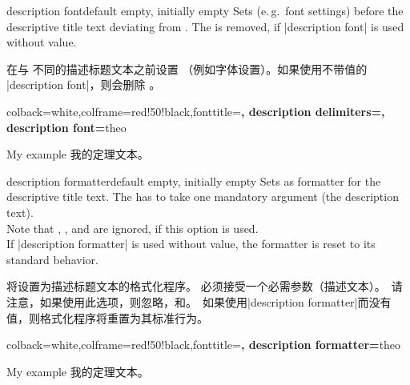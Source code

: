 \begin{docTcbKey}{description font}{}{default empty, initially empty}
Sets  (e.\,g.\ font settings) before the descriptive title text deviating from .
The  is removed, if |description font| is used without value.

在与  不同的描述标题文本之前设置 （例如字体设置）。如果使用不带值的 |description font|，则会删除 。
\begin{dispExample}
%
  {colback=white,colframe=red!50!black,fonttitle=\bfseries,
   description delimiters={\glqq}{\grqq},
   description font=\mdseries\itshape}{theo}
\begin{sometheorem}{My example}{}
我的定理文本。
\end{sometheorem}
\end{dispExample}
\end{docTcbKey}


\begin{docTcbKey}{description formatter}{}{default empty, initially empty}
Sets  as formatter for the descriptive title text. The 
has to take one mandatory argument (the description text).\\ 
Note that , ,
and  are ignored, if this option is used.\\
If |description formatter| is used without value, the formatter is reset
to its standard behavior.

将设置为描述标题文本的格式化程序。 必须接受一个必需参数（描述文本）。\ 请注意，如果使用此选项，则忽略，和。\ 如果使用|description formatter|而没有值，则格式化程序将重置为其标准行为。
\begin{dispExample}

%
  {colback=white,colframe=red!50!black,fonttitle=\bfseries,
   description formatter=\formbox}{theo}
\begin{sometheorem}{My example}{}
我的定理文本。
\end{sometheorem}
\end{dispExample}
\end{docTcbKey}


